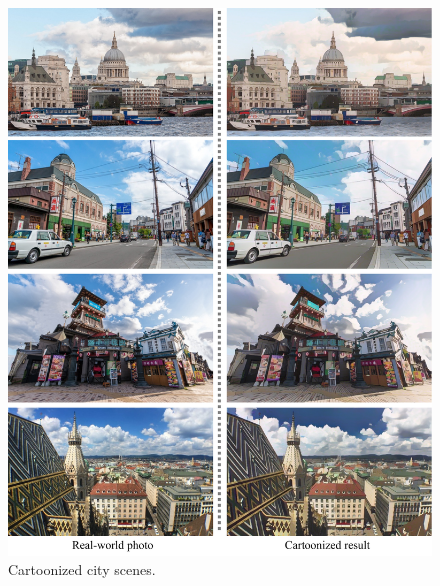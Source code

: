 \documentclass[10pt,twocolumn,letterpaper]{article}
\begin{document}
\begin{figure}[b]
\vspace{-0.5em}
\centering
\includegraphics[width=\linewidth]{figures/city1.pdf}
\caption{Cartoonized city scenes.}
\label{fig:city1}
\end{figure}
\end{document}
